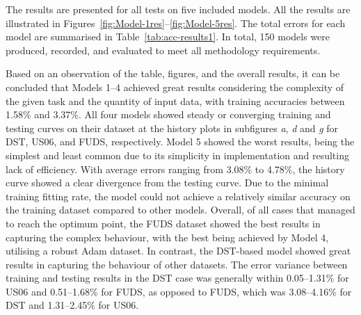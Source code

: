 
The results are presented for all tests on five included models.
All the results are illustrated in Figures~\ref{fig:Model-1res}--\ref{fig:Model-5res}.
The total errors for each model are summarised in Table~\ref{tab:acc-results1}.
In total, 150 models were produced, recorded, and evaluated to meet all methodology requirements.

Based on an observation of the table, figures, and the overall results, it can be concluded that Models 1--4 achieved great results considering the complexity of the given task and the quantity of input data, with training accuracies between 1.58\% and 3.37\%.
All four models showed steady or converging training and testing curves on their dataset at the history plots in subfigures \textit{a}, \textit{d} and \textit{g} for DST, US06, and FUDS, respectively.
Model 5 showed the worst results, being the simplest and least common due to its simplicity in implementation and resulting lack of efficiency.
With average errors ranging from 3.08\% to 4.78\%, the history curve showed a clear divergence from the testing curve.
Due to the minimal training fitting rate, the model could not achieve a relatively similar accuracy on the training dataset compared to other models.
Overall, of all cases that managed to reach the optimum point, the FUDS dataset showed the best results in capturing the complex behaviour, with the best being achieved by Model 4, utilising a robust Adam dataset.
In contrast, the DST-based model showed great results in capturing the behaviour of other datasets.
The error variance between training and testing results in the DST case was generally within 0.05--1.31\% for US06 and 0.51--1.68\% for FUDS, as opposed to FUDS, which was  3.08--4.16\% for DST and 1.31--2.45\% for US06.


